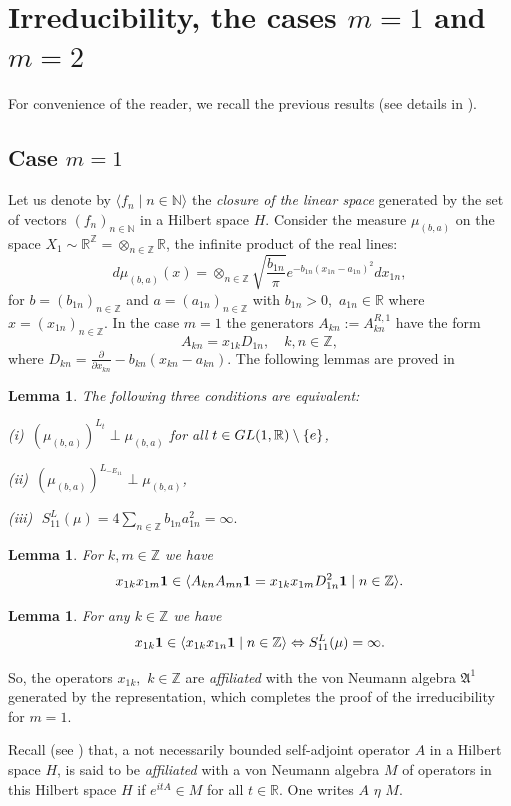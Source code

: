 \documentclass[preprint,12pt]{elsarticle}
\newtheorem{lem}[thm]{Lemma}
\numberwithin{equation}{section}
\begin{document}
\section{Irreducibility, the cases $m=1$ and $m=2$}
For convenience  of the reader, we recall  the previous results (see details
in \cite{KosJFA17}). 

\subsection{Case $m=1$}
Let us denote by $\langle f_n\mid n\in {\mathbb
N}\rangle$ the {\it closure of the linear space}
generated by the set of
vectors $(f_n)_{n\in{\mathbb N}}$ in a Hilbert space $H.$ Consider the measure $\mu_{(b,a)}$
on 
the space $X_1\sim \mathbb R^{\mathbb Z}=\otimes_{n\in\mathbb Z}\mathbb R$,
the infinite product of the real lines:
%
\begin{equation*}
 d\mu_{(b,a)}(x)=\otimes_{n\in \mathbb Z}\sqrt{\frac{b_{1n}}{\pi}}
e^{-b_{1n}(x_{1n}-a_{1n})^2}dx_{1n},
\end{equation*}
for $b=(b_{1n})_{n\in \mathbb Z}$ and $a=(a_{1n})_{n\in \mathbb Z}$ with $b_{1n}>0,\,\,a_{1n}\in \mathbb R$ where $x=(x_{1n})_{n\in \mathbb Z}$.  
In the case $m=1$ the generators $A_{kn}:=A_{kn}^{R,1}$ have the form
$$
A_{kn}=x_{1k}D_{1n},\quad k,n \in {\mathbb Z},
$$
where $D_{kn}=\frac{\partial }{\partial x_{kn}}-b_{kn}(x_{kn}-a_{kn}).$ The following lemmas are proved in \cite{KosAlb05J}
\begin{lem}
\label{5.1} The following  three conditions are equivalent:\par
(i)\,$\,\,(\mu_{(b,a)})^{L_t}\perp\mu_{(b,a)}$ for all $t\in
{\rm GL}(1,{\mathbb R})\setminus\{e\}$, \par
(ii)\,\,\,$(\mu_{(b,a)})^{L_{-E_{11}}}\perp\mu_{(b,a)}$,\par
(iii)\,\,\,\,$S^L_{11}(\mu)=4\sum_{n\in{\mathbb Z}}{b_{1n}}a_{1n}^2=\infty. $
\end{lem}
\begin{lem} 
\label{5.2}
 For $k,m\in {\mathbb Z}$ we have
$$
x_{1k}x_{1m}{\bf 1}\in\langle A_{kn}A_{mn}{\bf
1}=x_{1k}x_{1m}D_{1n}^2{\bf 1} \mid n\in {\mathbb Z}\rangle.
$$
\end{lem}
\begin{lem}
\label{5.3}
 For any $k\in {\mathbb Z}$ we have
$$
x_{1k}{\bf 1}\in\langle x_{1k}x_{1n}{\bf 1}\mid n\in {\mathbb Z}\rangle
\Leftrightarrow S^L_{11}(\mu)=\infty.
$$
\end{lem}
So, the operators $x_{1k},\,\,k\in {\mathbb Z}$  are {\it affiliated}
with the von Neumann algebra ${\mathfrak A}^1$ generated by the representation, which completes
the proof of the  irreducibility for $m=1.$
\begin{df}
\label{A-eta-M} Recall (see \cite{Dix69W}) that, a  not
necessarily bounded self-adjoint operator $A$ in a Hilbert space
$H$, is said to be {\it affiliated} with a von Neumann algebra $M$
of operators in this Hilbert space $H$ if $e^{itA}\in M$ for all
$t\in{\mathbb R}$. One writes $A\,\,\eta\,\,M$.
\end{df}
\end{document}
